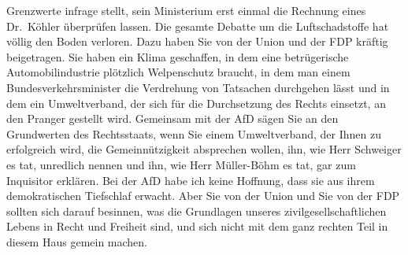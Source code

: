 \documentclass{article}
\begin{document}
Grenzwerte infrage stellt, sein Ministerium erst einmal die Rechnung eines Dr. Köhler überprüfen lassen.  Die gesamte Debatte um die Luftschadstoffe hat völlig den Boden verloren.  Dazu haben Sie von der Union und der FDP kräftig beigetragen. Sie haben ein Klima geschaffen, in dem eine betrügerische Automobilindustrie plötzlich Welpenschutz braucht, in dem man einem Bundesverkehrsminister die Verdrehung von Tatsachen durchgehen lässt und in dem ein Umweltverband, der sich für die Durchsetzung des Rechts einsetzt, an den Pranger gestellt wird.  Gemeinsam mit der AfD sägen Sie an den Grundwerten des Rechtsstaats, wenn Sie einem Umweltverband, der Ihnen zu erfolgreich wird, die Gemeinnützigkeit absprechen wollen, ihn, wie Herr Schweiger es tat, unredlich nennen und ihn, wie Herr Müller-Böhm es tat, gar zum Inquisitor erklären. Bei der AfD habe ich keine Hoffnung,  dass sie aus ihrem demokratischen Tiefschlaf erwacht. Aber Sie von der Union und Sie von der FDP sollten sich darauf besinnen, was die Grundlagen unseres zivilgesellschaftlichen Lebens in Recht und Freiheit sind, und sich nicht mit dem ganz rechten Teil in diesem Haus gemein machen.  
\end{document}
